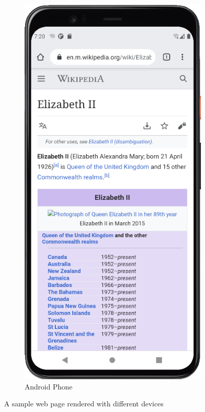 \begin{figure}[t]
\begin{subfigure}{0.2\textwidth}
  \includegraphics[width=1\textwidth]{intropage_phone}
  \caption{Android Phone}
  \label{intropage_phone}
\end{subfigure}
\caption{A sample web page rendered with different devices}
\label{intropage}
\end{figure}

